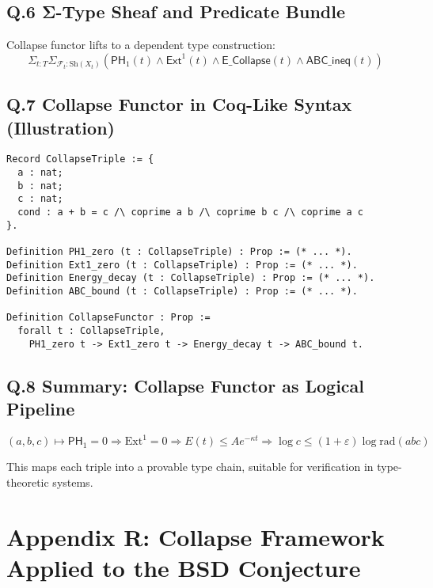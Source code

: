 \documentclass[11pt]{article}
\begin{document}
\subsection*{Q.6 Σ-Type Sheaf and Predicate Bundle}

Collapse functor lifts to a dependent type construction:
\[
\Sigma_{t:T} \Sigma_{\mathcal{F}_t:\mathrm{Sh}(X_t)} \left(
  \mathsf{PH}_1(t) \land \mathsf{Ext}^1(t) \land \mathsf{E\_Collapse}(t) \land \mathsf{ABC\_ineq}(t)
\right)
\]

\subsection*{Q.7 Collapse Functor in Coq-Like Syntax (Illustration)}

\begin{verbatim}
Record CollapseTriple := {
  a : nat;
  b : nat;
  c : nat;
  cond : a + b = c /\ coprime a b /\ coprime b c /\ coprime a c
}.

Definition PH1_zero (t : CollapseTriple) : Prop := (* ... *).
Definition Ext1_zero (t : CollapseTriple) : Prop := (* ... *).
Definition Energy_decay (t : CollapseTriple) : Prop := (* ... *).
Definition ABC_bound (t : CollapseTriple) : Prop := (* ... *).

Definition CollapseFunctor : Prop :=
  forall t : CollapseTriple,
    PH1_zero t -> Ext1_zero t -> Energy_decay t -> ABC_bound t.
\end{verbatim}

\subsection*{Q.8 Summary: Collapse Functor as Logical Pipeline}

\[
\boxed{
(a,b,c) \mapsto \mathsf{PH}_1 = 0 \Rightarrow \mathrm{Ext}^1 = 0 \Rightarrow E(t) \leq Ae^{-\kappa t} \Rightarrow \log c \leq (1+\varepsilon) \log \mathrm{rad}(abc)
}
\]

This maps each triple into a provable type chain, suitable for verification in type-theoretic systems.



\section*{Appendix R: Collapse Framework Applied to the BSD Conjecture}
\end{document}
